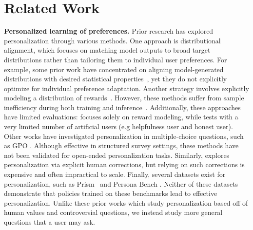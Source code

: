 \vspace{-0.15cm}
\section{Related Work}
\vspace{-0.15cm}

\noindent \textbf{Personalized learning of preferences.}
Prior research has explored personalization through various methods. One approach is distributional alignment, which focuses on matching model outputs to broad target distributions rather than tailoring them to individual user preferences. For example, some prior work have concentrated on aligning model-generated distributions with desired statistical properties~\citep{siththaranjan2024distributionalpreferencelearningunderstanding,meister2024benchmarkingdistributionalalignmentlarge, melnyk2024distributionalpreferencealignmentllms}, yet they do not explicitly optimize for individual preference adaptation. Another strategy involves explicitly modeling a distribution of rewards~\citep{lee2024testtimealignmenthypothesisreweighting, poddar2024personalizingreinforcementlearninghuman}. However, these methods suffer from sample inefficiency during both training and inference~\citep{rafailov2023direct,2023arXiv231012036G}. Additionally, these approaches have limited evaluations: \citet{lee2024testtimealignmenthypothesisreweighting} focuses solely on reward modeling, while \citet{poddar2024personalizingreinforcementlearninghuman} tests with a very limited number of artificial users (e.g helpfulness user and honest user). Other works have investigated personalization in multiple-choice questions, such as GPO \citep{zhao2024grouppreferenceoptimizationfewshot}. Although effective in structured survey settings, these methods have not been validated for open-ended personalization tasks. Similarly, \citet{shaikh2024showdonttellaligning} explores personalization via explicit human corrections, but relying on such corrections is expensive and often impractical to scale.  Finally, several datasets exist for personalization, such as Prism~\citep{kirk2024prismalignmentdatasetparticipatory} and Persona Bench \citep{castricato2024personareproducibletestbedpluralistic}. Neither of these datasets demonstrate that policies trained on these benchmarks lead to effective personalization. Unlike these prior works which study personalization based off of human values and controversial questions, we instead study more general questions that a user may ask.

